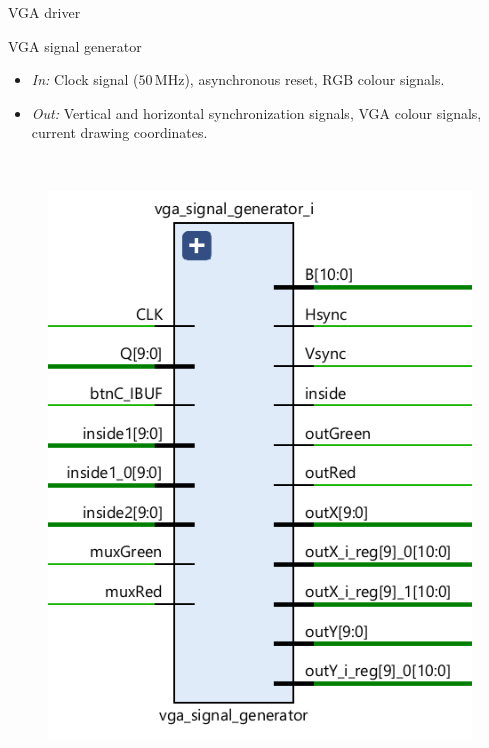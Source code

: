 \documentclass[aspectratio=169, 11pt, hyperref={unicode}]{beamer}
\def\MHz{\,\mathrm{MHz}}
\begin{document}
\begin{frame}{VGA driver}
    \begin{minipage}{.45\textwidth}
        VGA signal generator
        \begin{itemize}
            \item \emph{In:} Clock signal ($50\MHz$), asynchronous reset, RGB colour signals.
            \item \emph{Out:} Vertical and horizontal synchronization signals, VGA colour signals, current drawing coordinates.
        \end{itemize}
    \end{minipage}
    ~
    \begin{minipage}{.45\textwidth}
        \begin{figure}[!ht]
            \centering
            \includegraphics[scale=.5]{src/vga-signal-generator.png}
        \end{figure}
    \end{minipage}
\end{frame}
\end{document}

